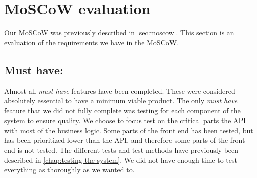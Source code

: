 \section{MoSCoW evaluation}
Our MoSCoW was previously described in \autoref{sec:moscow}. 
This section is an evaluation of the requirements we have in the MoSCoW.

\subsection{Must have:}
Almost all \textit{must have} features have been completed.
These were considered absolutely essential to have a minimum viable product. 
The only \textit{must have} feature that we did not fully complete was testing for each component of the system to ensure quality.
We choose to focus test on the critical parts the API with most of the business logic. 
Some parts of the front end has been tested, but has been prioritized lower than the API, and therefore some parts of the front end is not tested. 
The different tests and test methods have previously been described in \autoref{chap:testing-the-system}.
We did not have enough time to test everything as thoroughly as we wanted to.

